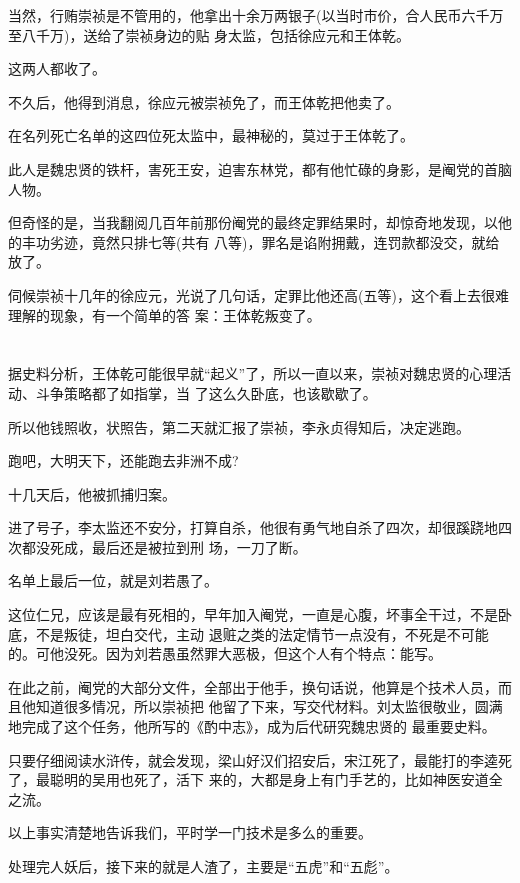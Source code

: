 \documentclass[11pt,a4paper,onecolumn]{article}
\begin{document}
当然，行贿崇祯是不管用的，他拿出十余万两银子(以当时市价，合人民币六千万至八千万)，送给了崇祯身边的贴
身太监，包括徐应元和王体乾。

这两人都收了。

不久后，他得到消息，徐应元被崇祯免了，而王体乾把他卖了。

在名列死亡名单的这四位死太监中，最神秘的，莫过于王体乾了。

此人是魏忠贤的铁杆，害死王安，迫害东林党，都有他忙碌的身影，是阉党的首脑人物。

但奇怪的是，当我翻阅几百年前那份阉党的最终定罪结果时，却惊奇地发现，以他的丰功劣迹，竟然只排七等(共有
八等)，罪名是谄附拥戴，连罚款都没交，就给放了。

伺候崇祯十几年的徐应元，光说了几句话，定罪比他还高(五等)，这个看上去很难理解的现象，有一个简单的答
案：王体乾叛变了。

\section[\thesection]{}

据史料分析，王体乾可能很早就``起义''了，所以一直以来，崇祯对魏忠贤的心理活动、斗争策略都了如指掌，当
了这么久卧底，也该歇歇了。

所以他钱照收，状照告，第二天就汇报了崇祯，李永贞得知后，决定逃跑。

跑吧，大明天下，还能跑去非洲不成?

十几天后，他被抓捕归案。

进了号子，李太监还不安分，打算自杀，他很有勇气地自杀了四次，却很蹊跷地四次都没死成，最后还是被拉到刑
场，一刀了断。

名单上最后一位，就是刘若愚了。

这位仁兄，应该是最有死相的，早年加入阉党，一直是心腹，坏事全干过，不是卧底，不是叛徒，坦白交代，主动
退赃之类的法定情节一点没有，不死是不可能的。可他没死。因为刘若愚虽然罪大恶极，但这个人有个特点：能写。

在此之前，阉党的大部分文件，全部出于他手，换句话说，他算是个技术人员，而且他知道很多情况，所以崇祯把
他留了下来，写交代材料。刘太监很敬业，圆满地完成了这个任务，他所写的《酌中志》，成为后代研究魏忠贤的
最重要史料。

只要仔细阅读水浒传，就会发现，梁山好汉们招安后，宋江死了，最能打的李逵死了，最聪明的吴用也死了，活下
来的，大都是身上有门手艺的，比如神医安道全之流。

以上事实清楚地告诉我们，平时学一门技术是多么的重要。

处理完人妖后，接下来的就是人渣了，主要是``五虎''和``五彪''。
\end{document}
